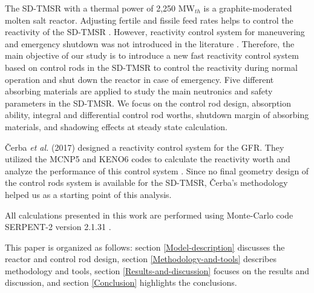 The \gls{SD-TMSR} with a thermal power of 2,250 MW$_{th}$ 
\cite{ashraf2019whole_core,li_optimization_2018} is a graphite-moderated 
molten salt reactor. Adjusting fertile and fissile feed rates helps to control the reactivity of 
the SD-TMSR \cite{ashraf2019whole_core,ashraf2020Strategies,li_optimization_2018}. However, reactivity control system for maneuvering and emergency shutdown was not introduced in the literature \cite{li_optimization_2018,zou2018transition,zhang2020radiotoxicity,jiang2012advanced,zou2018preliminary,ZOU2015114}. Therefore, the main objective of our study is to introduce a new 
fast reactivity control system based on control rods in the \gls{SD-TMSR} to control 
the reactivity during normal operation and shut down the reactor in case of  
emergency. Five different absorbing materials are 
applied to study the main neutronics and safety parameters in the SD-TMSR. We 
focus on the control rod design, absorption ability, integral and differential 
control rod worths, shutdown margin of absorbing materials, and shadowing 
effects at steady state calculation.

\v{C}erba \emph{et al.} (2017) designed a reactivity control system for the 
GFR. They utilized the MCNP5 \cite{briesmeister2000mcnptm} and KENO6 codes 
\cite{petrie1984keno} to calculate the reactivity worth and analyze the 
performance of this control system \cite{vcerba2017optimization}. Since no 
final geometry design of the control rods system is available for the SD-TMSR, 
\v{C}erba's methodology \cite{vcerba2017optimization}  helped us as a starting 
point of this analysis.

All calculations presented in this work are performed using Monte-Carlo code SERPENT-2 version 2.1.31 \cite{leppanen2014serpent}.

This paper is organized as follows: section \ref{Model-description} discusses the reactor and control rod design, section \ref{Methodology-and-tools} describes methodology and tools, section \ref{Results-and-discussion} focuses on the results and discussion, and section \ref{Conclusion} highlights the conclusions.